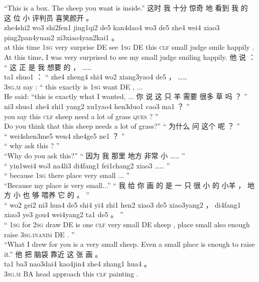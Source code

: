 \documentclass[UTF8]{ctexart}
\begin{document}
\begin{exe}
\trans ``This is a box. The sheep you want is inside.''
\ex
\glll
这时 我 十分 惊奇 地 看到 我 的 这 位 小 评判员 喜笑颜开 。
\\
zhe4shi2 wo3 shi2fen1 jing1qi2 de5 kan4dao4 wo3 de5 zhe4 wei4 xiao3 ping2pan4yuan2 xi3xiao4yan2kai1 。
\\
{at this time} \textsc{1sg} very surprise DE see \textsc{1sg} DE this \textsc{clf} small judge {smile happily} .
\\
\trans At this time, I was very surprised to see my small judge smiling happily.
\ex
\glll
他 说 ： “ 这 正 是 我 想要 的 ， ……
\\
ta1 shuo1 ： “ zhe4 zheng4 shi4 wo2 xiang3yao4 de5 ， ……
\\
\textsc{3sg.m} say : `` this exactly is \textsc{1sg} want DE , ...
\\
\trans He said: ``this is exactly what I wanted, ...
\ex
\glll
你 说 这 只 羊 需要 很多 草 吗 ？ ”
\\
ni3 shuo1 zhe4 zhi1 yang2 xu1yao4 hen3duo1 cao3 ma1 ？ ”
\\
you say this \textsc{clf} sheep need {a lot of} grass \textsc{ques} ? ''
\\
\trans Do you think that this sheep needs a lot of grass?''
\ex
\glll
“ 为什么 问 这个 呢 ？ ”
\\
“ wei4shen3me5 wen4 zhe4ge5 ne1 ？ ”
\\
`` why ask this {} ? ''
\\
\trans ``Why do you ask this?''
\ex
\glll
“ 因为 我 那里 地方 非常 小 …… ”
\\
“ yin1wei4 wo3 na4li3 di4fang1 fei1chang2 xiao3 …… ”
\\
`` because \textsc{1sg} there place very small ... ''
\\
\trans ``Because my place is very small...''
\ex
\glll
“ 我 给 你 画 的 是 一 只 很 小 的 小羊 ， 地方 小 也 够 喂养 它 的 。 ”
\\
“ wo2 gei2 ni3 hua4 de5 shi4 yi4 zhi1 hen2 xiao3 de5 xiao3yang2 ， di4fang1 xiao3 ye3 gou4 wei4yang2 ta1 de5 。 ”
\\
`` \textsc{1sg} for \textsc{2sg} draw DE is one \textsc{clf} very small DE sheep , place small also enough raise \textsc{3sg.inanim} DE . ''
\\
\trans ``What I drew for you is a very small sheep. Even a small place is enough to raise it.''
\ex
\glll
他 把 脑袋 靠近 这 张 画 。
\\
ta1 ba3 nao3dai4 kao4jin4 zhe4 zhang1 hua4 。
\\
\textsc{3sg.m} BA head approach this \textsc{clf} painting .

\end{exe}
\end{document}
